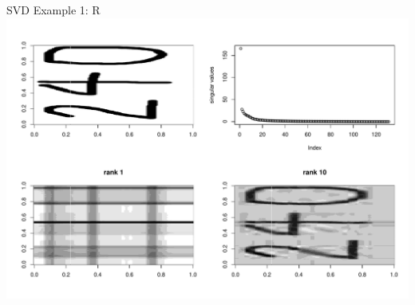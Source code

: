 \documentclass[
  ignorenonframetext,
]{beamer}
\begin{document}
\begin{frame}{SVD Example 1: R}
\protect\hypertarget{svd-example-1-r-1}{}
\includegraphics{Lecture02_MatrixOperations_files/figure-beamer/unnamed-chunk-21-1.pdf}
\end{frame}
\end{document}
